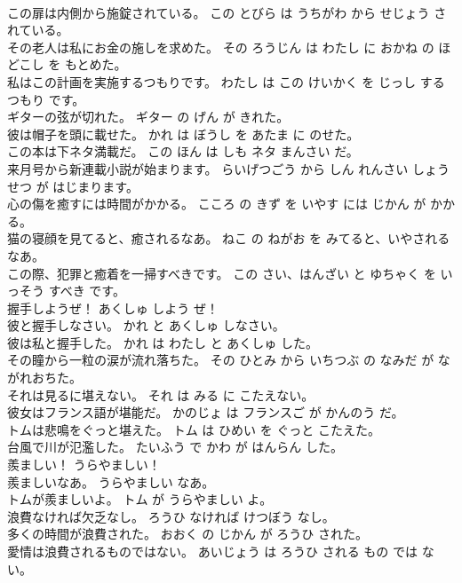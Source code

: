 \documentclass[8pt]{extreport}
\begin{document}
\begin{CJK}{UTF8}{min}
\\	この扉は内側から施錠されている。	この とびら は うちがわ から せじょう されている。	
\\	その老人は私にお金の施しを求めた。	その ろうじん は わたし に おかね の ほどこし を もとめた。	
\\	私はこの計画を実施するつもりです。	わたし は この けいかく を じっし する つもり です。	
\\	ギターの弦が切れた。	ギター の げん が きれた。	
\\	彼は帽子を頭に載せた。	かれ は ぼうし を あたま に のせた。	
\\	この本は下ネタ満載だ。	この ほん は しも ネタ まんさい だ。	
\\	来月号から新連載小説が始まります。	らいげつごう から しん れんさい しょうせつ が はじまります。	
\\	心の傷を癒すには時間がかかる。	こころ の きず を いやす には じかん が かかる。	
\\	猫の寝顔を見てると、癒されるなあ。	ねこ の ねがお を みてると、いやされる なあ。	
\\	この際、犯罪と癒着を一掃すべきです。	この さい、はんざい と ゆちゃく を いっそう すべき です。	
\\	握手しようぜ！	あくしゅ しよう ぜ！	
\\	彼と握手しなさい。	かれ と あくしゅ しなさい。	
\\	彼は私と握手した。	かれ は わたし と あくしゅ した。	
\\	その瞳から一粒の涙が流れ落ちた。	その ひとみ から いちつぶ の なみだ が ながれおちた。	
\\	それは見るに堪えない。	それ は みる に こたえない。	
\\	彼女はフランス語が堪能だ。	かのじょ は フランスご が かんのう だ。	
\\	トムは悲鳴をぐっと堪えた。	トム は ひめい を ぐっと こたえた。	
\\	台風で川が氾濫した。	たいふう で かわ が はんらん した。	
\\	羨ましい！	うらやましい！	
\\	羨ましいなあ。	うらやましい なあ。	
\\	トムが羨ましいよ。	トム が うらやましい よ。	
\\	浪費なければ欠乏なし。	ろうひ なければ けつぼう なし。	
\\	多くの時間が浪費された。	おおく の じかん が ろうひ された。	
\\	愛情は浪費されるものではない。	あいじょう は ろうひ される もの では ない。	

\end{CJK}
\end{document}
